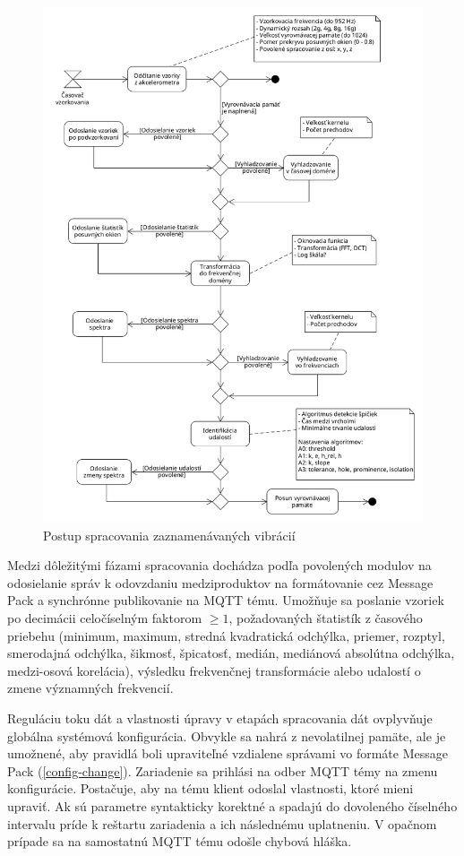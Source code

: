 \begin{figure}[h!]
	\centering
	\includegraphics[width=\textwidth]{figures/design/pipeline.png}
	\caption{Postup spracovania zaznamenávaných vibrácií}
	\label{pipeline}
\end{figure}

Medzi dôležitými fázami spracovania dochádza podľa povolených modulov na odosielanie správ k odovzdaniu medziproduktov na formátovanie
cez Message Pack a synchrónne publikovanie na MQTT tému. Umožňuje sa poslanie vzoriek po decimácii celočíselným faktorom $\geq 1$,
požadovaných štatistík z časového priebehu (minimum, maximum, stredná kvadratická odchýlka, priemer, rozptyl, smerodajná odchýlka,
šikmosť, špicatosť, medián, mediánová absolútna odchýlka, medzi-osová korelácia), výsledku frekvenčnej transformácie alebo udalostí
o zmene významných frekvencií.

Reguláciu toku dát a vlastnosti úpravy v etapách spracovania dát ovplyvňuje globálna systémová konfigurácia. Obvykle sa nahrá
z nevolatilnej pamäte, ale je umožnené, aby pravidlá boli upraviteľné vzdialene správami vo formáte Message Pack (\ref{config-change}).
Zariadenie sa prihlási na odber MQTT témy na zmenu konfigurácie. Postačuje, aby na tému klient odoslal vlastnosti, ktoré mieni
upraviť. Ak sú parametre syntakticky korektné a spadajú do dovoleného číselného intervalu príde k reštartu zariadenia a ich
následnému uplatneniu. V opačnom prípade sa na samostatnú MQTT tému odošle chybová hláška.

